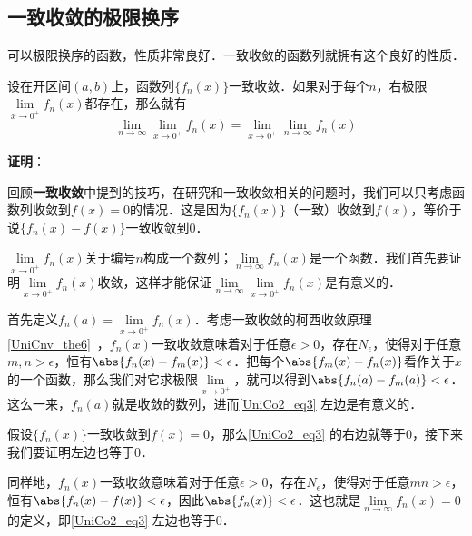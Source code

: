 \subsection{一致收敛的极限换序}

可以极限换序的函数，性质非常良好．一致收敛的函数列就拥有这个良好的性质．

\begin{theorem}{}
设在开区间$(a, b)$上，函数列$\{f_n(x)\}$一致收敛．如果对于每个$n$，右极限$\lim\limits_{x\to 0^+}f_n(x)$都存在，那么就有
\begin{equation}\label{UniCo2_eq3}
\lim\limits_{n\to\infty}\lim\limits_{x\to 0^+}f_n(x)=\lim\limits_{x\to 0^+}\lim\limits_{n\to\infty}f_n(x)
\end{equation}
\end{theorem}

\textbf{证明}：

回顾\textbf{一致收敛}中提到的技巧，在研究和一致收敛相关的问题时，我们可以只考虑函数列收敛到$f(x)=0$的情况．这是因为$\{f_n(x)\}$（一致）收敛到$f(x)$，等价于说$\{f_n(x)-f(x)\}$一致收敛到$0$．

$\lim\limits_{x\to 0^+}f_n(x)$关于编号$n$构成一个数列；$\lim\limits_{n\to\infty}f_n(x)$是一个函数．我们首先要证明$\lim\limits_{x\to 0^+}f_n(x)$收敛，这样才能保证$\lim\limits_{n\to\infty}\lim\limits_{x\to 0^+}f_n(x)$是有意义的．

首先定义$f_n(a)=\lim\limits_{x\to 0^+}f_n(x)$．考虑一致收敛的柯西收敛原理\autoref{UniCnv_the6}~，$f_n(x)$一致收敛意味着对于任意$\epsilon>0$，存在$N_\epsilon$，使得对于任意$m, n>\epsilon$，恒有$\abs{f_n(x)-f_m(x)}<\epsilon$．把每个$\abs{f_m(x)-f_n(x)}$看作关于$x$的一个函数，那么我们对它求极限$\lim\limits_{x\to 0^+}$，就可以得到$\abs{f_n(a)-f_m(a)}<\epsilon$．这么一来，$f_n(a)$就是收敛的数列，进而\autoref{UniCo2_eq3} 左边是有意义的．

假设$\{f_n(x)\}$一致收敛到$f(x)=0$，那么\autoref{UniCo2_eq3} 的右边就等于$0$，接下来我们要证明左边也等于$0$．

同样地，$f_n(x)$一致收敛意味着对于任意$\epsilon>0$，存在$N_\epsilon$，使得对于任意$mn>\epsilon$，恒有$\abs{f_n(x)-f(x)}<\epsilon$，因此$\abs{f_n(x)}<\epsilon$．这也就是$\lim\limits_{n\to\infty}f_n(x)=0$的定义，即\autoref{UniCo2_eq3} 左边也等于$0$．



